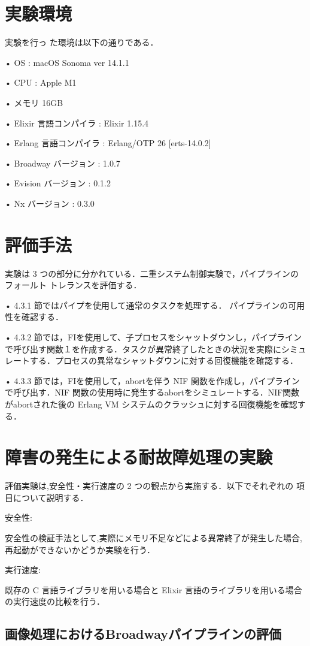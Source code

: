 \documentclass[a4paper]{jreport}	%
\begin{document}
\section{実験環境}
実験を行っ た環境は以下の通りである．

• OS : macOS Sonoma ver 14.1.1 

• CPU : Apple M1

• メモリ 16GB 

• Elixir 言語コンパイラ : Elixir 1.15.4

• Erlang 言語コンパイラ : Erlang/OTP 26 [erts-14.0.2]

• Broadway バージョン :  1.0.7

• Evision バージョン :  0.1.2

• Nx バージョン :  0.3.0

\section{評価手法}
実験は 3 つの部分に分かれている．二重システム制御実験で，パイプラインのフォールト トレランスを評価する．

• 4.3.1 節ではパイプを使用して通常のタスクを処理する． パイプラインの可用性を確認する．

• 4.3.2 節では，FIを使用して、子プロセスをシャットダウンし，パイプラインで呼び出す関数１を作成する．タスクが異常終了したときの状況を実際にシミュレートする．プロセスの異常なシャットダウンに対する回復機能を確認する．

• 4.3.3 節では，FIを使用して，abortを伴う NIF 関数を作成し，パイプラインで呼び出す．NIF 関数の使用時に発生するabortをシミュレートする．NIF関数がabortされた後の Erlang VM システムのクラッシュに対する回復機能を確認する．


\section{障害の発生による耐故障処理の実験}
評価実験は,安全性・実行速度の 2 つの観点から実施する．以下でそれぞれの 項目について説明する．

安全性:

安全性の検証手法として,実際にメモリ不足などによる異常終了が発生した場合,再起動ができないかどうか実験を行う．

実行速度: 

既存の C 言語ライブラリを用いる場合と Elixir 言語のライブラリを用いる場合の実行速度の比較を行う．
\subsection{画像処理におけるBroadwayパイプラインの評価} 
\end{document}
